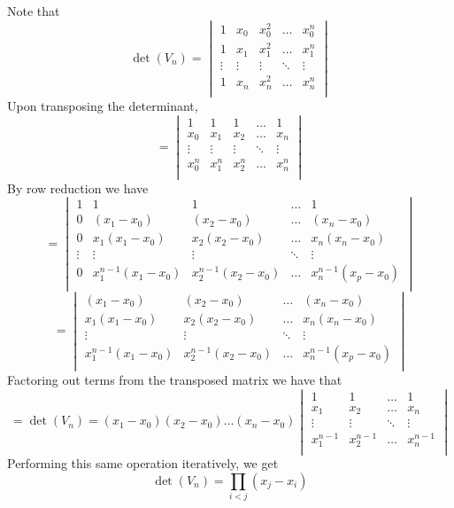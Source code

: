 \documentclass[letterpaper,12pt]{article}
\theoremstyle{definition}
\begin{document}
Note that 
\[\det(V_n)=\begin{vmatrix}
   1 &  x_0 & x_0^2&\hdots&x_0^n \\
   1 &  x_1& x_1^2&\hdots&x_1^n\\
   \vdots&\vdots&\vdots &\ddots&\vdots\\
   1 &  x_n& x_n^2&\hdots&x_n^n\\
   \end{vmatrix}\]
   Upon transposing the determinant,
\[=\begin{vmatrix}
   1 &  1& 1&\hdots&1 \\
   x_0 &  x_1& x_2&\hdots&x_n\\
   \vdots&\vdots&\vdots &\ddots&\vdots\\
   x_0^n &  x_1^n& x_2^n&\hdots&x_n^n\\
   \end{vmatrix}\]
   By row reduction we have
   \[=\begin{vmatrix}
   1 &  1& 1&\hdots&1 \\
   0 &  (x_1-x_0)& (x_2-x_0) &\hdots&(x_n-x_0)\\
   0&x_1(x_1-x_0)& x_2(x_2-x_0)&\hdots& x_n(x_n-x_0)\\
   \vdots&\vdots&\vdots &\ddots&\vdots\\
   0 &  x_1^{n-1}(x_1-x_0)& x_2^{n-1}(x_2-x_0)&\hdots&x_n^{n-1}(x_p-x_0)\\
   \end{vmatrix}\]
   \[=\begin{vmatrix}
   (x_1-x_0)& (x_2-x_0) &\hdots&(x_n-x_0)\\
   x_1(x_1-x_0)& x_2(x_2-x_0)&\hdots& x_n(x_n-x_0)\\
   \vdots&\vdots &\ddots&\vdots\\
  x_1^{n-1}(x_1-x_0)& x_2^{n-1}(x_2-x_0)&\hdots&x_n^{n-1}(x_p-x_0)\\
   \end{vmatrix}\]
   Factoring out terms from the transposed matrix we have that
   \[=\det(V_n)=(x_{1}-x_{0})(x_2-x_0)\hdots(x_n-x_0)
   \begin{vmatrix}
   1& 1 &\hdots&1\\
   x_1& x_2&\hdots& x_n\\
   \vdots&\vdots &\ddots&\vdots\\
  x_1^{n-1}& x_2^{n-1}&\hdots&x_n^{n-1}\\
   \end{vmatrix} \]
   Performing this same operation iteratively, we get
\[\det (V_n)=\prod _{i<j}(x_j-x_i)\]
\end{document}
